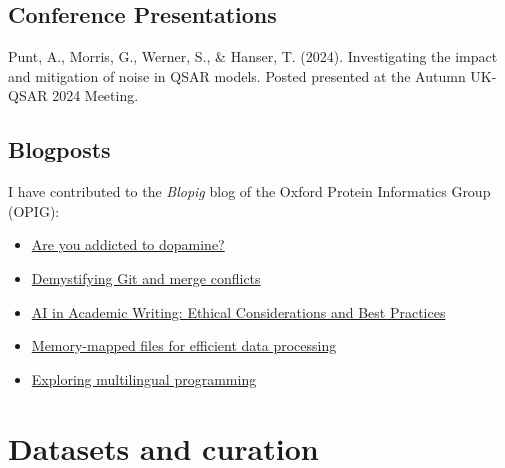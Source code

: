 \section*{Conference Presentations}
Punt, A., Morris, G., Werner, S., \& Hanser, T. (2024). Investigating the impact and mitigation of noise in QSAR models. Posted presented at the Autumn UK-QSAR 2024 Meeting.


\section*{Blogposts}

I have contributed to the \textit{Blopig} blog of the Oxford Protein Informatics Group (OPIG):

\begin{itemize}
    \item \href{https://www.blopig.com/blog/2025/10/are-you-addicted-to-dopamine/}{Are you addicted to dopamine?}
    \item \href{https://www.blopig.com/blog/2025/05/demystifying-git-and-merge-conflicts/}{Demystifying Git and merge conflicts}
    \item \href{https://www.blopig.com/blog/2025/03/ai-in-academic-writing-ethical-considerations-and-best-practices/}{AI in Academic Writing: Ethical Considerations and Best Practices}
    \item \href{https://www.blopig.com/blog/2024/08/memory-mapped-files-for-efficient-data-processing/}{Memory-mapped files for efficient data processing}
    \item \href{https://www.blopig.com/blog/2024/04/exploring-multilingual-programming/}{Exploring multilingual programming}
\end{itemize}


\appendix

\chapter{Datasets and curation}\label{app:datasets}


